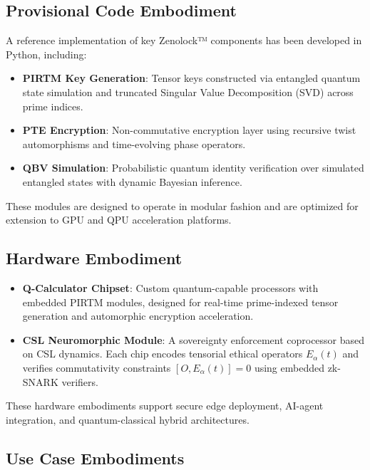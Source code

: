 \documentclass{article}
\theoremstyle{plain}
\begin{document}
\subsection{Provisional Code Embodiment}

A reference implementation of key Zenolock™ components has been developed in Python, including:

\begin{itemize}
  \item \textbf{PIRTM Key Generation}: Tensor keys constructed via entangled quantum state simulation and truncated Singular Value Decomposition (SVD) across prime indices.
  
  \item \textbf{PTE Encryption}: Non-commutative encryption layer using recursive twist automorphisms and time-evolving phase operators.

  \item \textbf{QBV Simulation}: Probabilistic quantum identity verification over simulated entangled states with dynamic Bayesian inference.
\end{itemize}

These modules are designed to operate in modular fashion and are optimized for extension to GPU and QPU acceleration platforms.

\subsection{Hardware Embodiment}

\begin{itemize}
  \item \textbf{Q-Calculator Chipset}: Custom quantum-capable processors with embedded PIRTM modules, designed for real-time prime-indexed tensor generation and automorphic encryption acceleration.

  \item \textbf{CSL Neuromorphic Module}: A sovereignty enforcement coprocessor based on CSL dynamics. Each chip encodes tensorial ethical operators $E_\alpha(t)$ and verifies commutativity constraints $[O, E_\alpha(t)] = 0$ using embedded zk-SNARK verifiers.
\end{itemize}

These hardware embodiments support secure edge deployment, AI-agent integration, and quantum-classical hybrid architectures.

\subsection{Use Case Embodiments}
\end{document}
